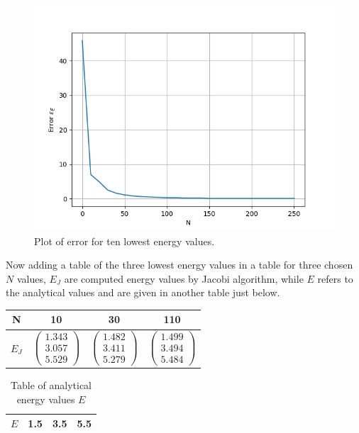 \documentclass[aip,nobalancelastpage,
twocolumn,
rsi,%
 amsmath,amssymb,
 reprint,%
]{revtex4}
\begin{document}
\begin{figure}[H]
\includegraphics[scale=0.6]{fig1.png}
\caption{Plot of error for ten lowest energy values.}
\label{part 2: plot 1}
\end{figure}
Now adding a table of the three lowest energy values in a table for three chosen $N$ values, $E_J$ are computed energy values by Jacobi algorithm, while $E$ refers to the analytical values and are given in another table just below.
\begin{table}[H]
\center
\begin{tabular}{|c | c | c | c |}
\hline
N & 10 & 30 & 110\\
\hline
$E_J$ & $\begin{pmatrix} 1.343\\3.057\\5.529 \end{pmatrix}$ & $\begin{pmatrix} 1.482\\3.411\\5.279 \end{pmatrix}$ & $\begin{pmatrix} 1.499\\3.494\\5.484 \end{pmatrix}$\\
\hline
\end{tabular}
\label{part2: table 2}
\end{table}

\begin{table}[H]
\center
\caption{Table of analytical energy values $E$}
\begin{tabular}{| c | c | c | c |}
\hline
$E$ & 1.5 & 3.5 & 5.5\\
\hline 
\end{tabular}
\label{part 2: table 3}
\end{table}
\end{document}
